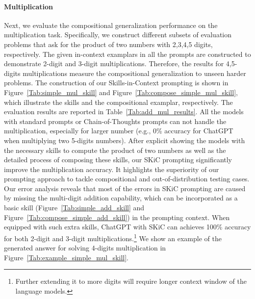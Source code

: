\paragraph{Multiplication} 
Next, we evaluate the compositional generalization performance on the multiplication task. Specifically, we construct different subsets of evaluation problems that ask for the product of two numbers with 2,3,4,5 digits, respectively. The given in-context examplars in all the prompts are constructed to demonstrate 2-digit and 3-digit multiplications. Therefore, the results for 4,5-digits multiplications measure the compositional generalization to unseen harder problems.
The construction of our Skills-in-Context prompting is shown in Figure~\ref{Tab:simple_mul_skill} and Figure~\ref{Tab:compose_simple_mul_skill}, which illustrate the skills and the compositional examplar, respectively. The evaluation results are reported in Table~\ref{Tab:add_mul_results}. All the models with standard prompts or Chain-of-Thoughts prompts can not handle the multiplication, especially for larger number (e.g., 0\% accuracy for ChatGPT when multiplying two 5-digits numbers). After explicit showing the models with the necessary skills to compute the product of two numbers as well as the detailed process of composing these skills, our SKiC prompting significantly improve the multiplication accuracy. It highlights the superiority of our prompting approach to tackle compositional and out-of-distribution testing cases. Our error analysis reveals that most of the errors in SKiC prompting are caused by missing the multi-digit addition capability, which can be incorporated as a basic skill (Figure~\ref{Tab:simple_add_skill} and Figure~\ref{Tab:compose_simple_add_skill}) in the prompting context. When equipped with such extra skills, ChatGPT with SKiC can achieves 100\% accuracy for both 2-digit and 3-digit multiplications.\footnote{Further extending it to more digits will require longer context window of the language models.} We show an example of the generated answer for solving 4-digits multiplication in Figure~\ref{Tab:example_simple_mul_skill}.











